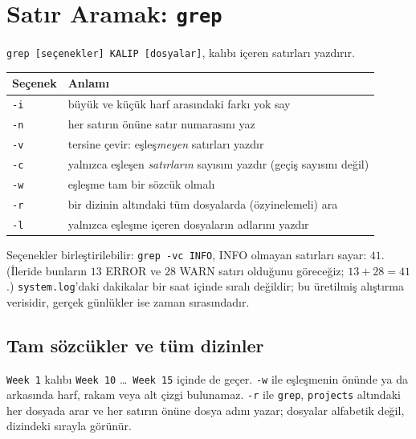 \documentclass[11pt,a4paper]{article}
\newcommand{\cmd}[1]{\texttt{#1}}
\begin{document}
\section{Satır Aramak: \texttt{grep}}
\label{sec:grep}

\cmd{grep [seçenekler] KALIP [dosyalar]}, kalıbı içeren satırları yazdırır.



\begin{center}
\renewcommand{\arraystretch}{1.2}
\begin{tabular}{@{}lp{11.5cm}@{}}
\toprule
\textbf{Seçenek} & \textbf{Anlamı}\\
\midrule
\cmd{-i} & büyük ve küçük harf arasındaki farkı yok say\\
\cmd{-n} & her satırın önüne satır numarasını yaz\\
\cmd{-v} & tersine çevir: eşleş\emph{meyen} satırları yazdır\\
\cmd{-c} & yalnızca eşleşen \emph{satırların} sayısını yazdır (geçiş sayısını değil)\\
\cmd{-w} & eşleşme tam bir sözcük olmalı\\
\cmd{-r} & bir dizinin altındaki tüm dosyalarda (özyinelemeli) ara\\
\cmd{-l} & yalnızca eşleşme içeren dosyaların adlarını yazdır\\
\bottomrule
\end{tabular}
\end{center}

Seçenekler birleştirilebilir: \cmd{grep -vc INFO}, INFO olmayan satırları sayar: $41$. (İleride bunların $13$ ERROR ve $28$ WARN satırı olduğunu göreceğiz; $13 + 28 = 41$.) \texttt{system.log}'daki dakikalar bir saat içinde sıralı değildir; bu üretilmiş alıştırma verisidir, gerçek günlükler ise zaman sırasındadır.

\subsection{Tam sözcükler ve tüm dizinler}



\texttt{Week 1} kalıbı \texttt{Week 10} \dots\ \texttt{Week 15} içinde de geçer. \cmd{-w} ile eşleşmenin önünde ya da arkasında harf, rakam veya alt çizgi bulunamaz. \cmd{-r} ile \cmd{grep}, \texttt{projects} altındaki her dosyada arar ve her satırın önüne dosya adını yazar; dosyalar alfabetik değil, dizindeki sırayla görünür.
\end{document}
